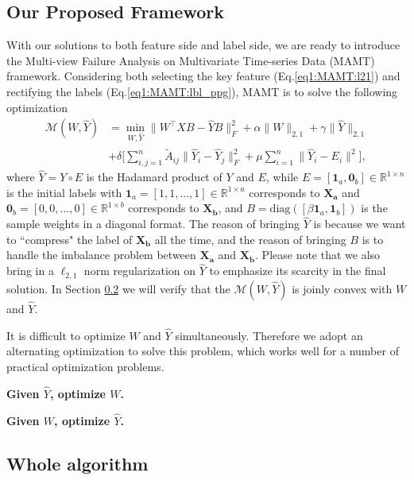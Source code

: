 \subsection{Our Proposed Framework}
\label{sec:MAMT:alg:framework} 
With our solutions to both feature side and label side, we are ready to introduce the Multi-view Failure Analysis on Multivariate Time-series Data (MAMT) framework. Considering both selecting the key feature (Eq.\ref{eq1:MAMT:l21}) and rectifying the labels (Eq.\ref{eq1:MAMT:lbl_ppg}), MAMT is to solve the following optimization 
\begin{align*}
\label{eq1:MAMT:mamt}
\mathcal{M}(W, \hat{Y}) &= \min_{W, \hat{Y}}  \| W^\top XB - \hat{Y}B\|_F^2 + \alpha\|W\|_{2,1} + \gamma\|\hat{Y}\|_{2,1}\\&+ \delta\bigg[\sum_{i,j=1}^n \tilde{A}_{ij}\|\hat{Y}_i-\hat{Y}_j\|_F^2+\mu\sum_{i=1}^n\|\hat{Y}_i-E_i\|^2\bigg],
\end{align*}
where $\hat{Y} = Y \circ E$ is the Hadamard product of $Y$ and $E$, while 
$E = [\textbf{1}_a, \textbf{0}_b] \in \mathbb{R}^{1 \times n}$ is the initial labels with $\textbf{1}_a = [1,1,...,1] \in \mathbb{R}^{1 \times a}$ corresponds to $\textbf{X}_\textbf{a}$ and $\textbf{0}_b = [0,0,...,0] \in \mathbb{R}^{1 \times b}$ corresponds to $\textbf{X}_\textbf{b}$, and $B = \mathrm{diag}([\beta\textbf{1}_a, \textbf{1}_b])$ is the sample weights in a diagonal format. The reason of bringing $\hat{Y}$ is because we want to ``compress" the label of $\textbf{X}_\textbf{b}$ all the time, and the reason of bringing $B$ is to handle the imbalance problem between $\textbf{X}_\textbf{a}$ and $\textbf{X}_\textbf{b}$. Please note that we also bring in a  $\ell_{2,1}$ norm regularization on $\hat{Y}$ to emphasize its scarcity in the final solution. In Section \ref{sec:MAMT:alg:proof_early} we will verify that the $\mathcal{M}(W, \hat{Y})$ is joinly convex with $W$ and $\hat{Y}$. 
 
It is difficult to optimize $W$ and $\hat{Y}$ simultaneously. Therefore we adopt an alternating optimization to solve this problem, which works well for a number of practical optimization problems\cite{feng2012adaptive, tang2013coselect}. 

\smallskip
\noindent\textbf{Given $\hat{Y}$, optimize $W$.}

\smallskip
\noindent\textbf{Given $W$, optimize $\hat{Y}$.}

\subsection{\color{red}{Proof and Early Stopping} }
\label{sec:MAMT:alg:proof_early} 

\subsection{Whole algorithm}
\label{sec:MAMT:alg:alg} 